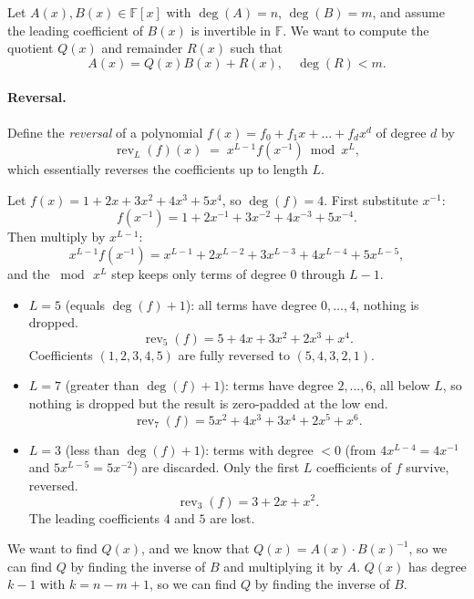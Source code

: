 Let $A(x), B(x) \in \mathbb{F}[x]$ with $\deg(A)=n$, $\deg(B)=m$, and assume
the leading coefficient of $B(x)$ is invertible in $\mathbb{F}$. We want to compute
the quotient $Q(x)$ and remainder $R(x)$ such that
\[
A(x) = Q(x) B(x) + R(x), \quad \deg(R) < m.
\]

\paragraph{Reversal.}
Define the \emph{reversal} of a polynomial $f(x)=f_0 + f_1 x + \dots + f_d x^d$ of degree $d$
by
\[
\operatorname{rev}_L(f)(x) \;=\; x^{L-1} f\!\left(x^{-1}\right) \bmod x^L,
\]
which essentially reverses the coefficients up to length $L$.

\begin{examplebox}
  Let $f(x) = 1 + 2x + 3x^2 + 4x^3 + 5x^4$, so $\deg(f)=4$.
  First substitute $x^{-1}$:
  \[ f(x^{-1}) = 1 + 2x^{-1} + 3x^{-2} + 4x^{-3} + 5x^{-4}. \]
  Then multiply by $x^{L-1}$:
  \[ x^{L-1}f(x^{-1}) = x^{L-1} + 2x^{L-2} + 3x^{L-3} + 4x^{L-4} + 5x^{L-5}, \]
  and the $\bmod\, x^L$ step keeps only terms of degree $0$ through $L-1$.
  \begin{itemize}
    \item $L=5$ (equals $\deg(f)+1$): all terms have degree $0,\dots,4$, nothing is dropped.
      \[ \operatorname{rev}_5(f) = 5 + 4x + 3x^2 + 2x^3 + x^4. \]
      Coefficients $(1,2,3,4,5)$ are fully reversed to $(5,4,3,2,1)$.
    \item $L=7$ (greater than $\deg(f)+1$): terms have degree $2,\dots,6$, all below $L$, so nothing is dropped but the result is zero-padded at the low end.
      \[ \operatorname{rev}_7(f) = 5x^2 + 4x^3 + 3x^4 + 2x^5 + x^6. \]
    \item $L=3$ (less than $\deg(f)+1$): terms with degree $< 0$ (from $4x^{L-4}=4x^{-1}$ and $5x^{L-5}=5x^{-2}$) are discarded. Only the first $L$ coefficients of $f$ survive, reversed.
      \[ \operatorname{rev}_3(f) = 3 + 2x + x^2. \]
      The leading coefficients $4$ and $5$ are lost.
  \end{itemize}
\end{examplebox}

We want to find $Q(x)$, and we know that $Q(x) = A(x)\cdot B(x)^{-1}$, so we can find $Q$ by finding the inverse of $B$ and multiplying it by $A$.
$Q(x)$ has degree $k-1$ with $k=n-m+1$, so we can find $Q$ by finding the inverse of $B$.

